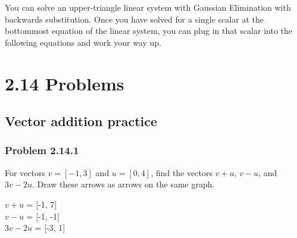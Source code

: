 \documentclass[
  letterpaper,
  DIV=11,
  numbers=noendperiod]{scrartcl}
\begin{document}
You can solve an upper-triangle linear system with Gaussian Elimination
with backwards substitution. Once you have solved for a single scalar at
the bottommost equation of the linear system, you can plug in that
scalar into the following equations and work your way up.

\hypertarget{problems}{%
\section{\texorpdfstring{\textbf{2.14
Problems}}{2.14 Problems}}\label{problems}}

\hypertarget{vector-addition-practice}{%
\subsection{Vector addition practice}\label{vector-addition-practice}}

\hypertarget{problem-2.14.1}{%
\subsubsection{Problem 2.14.1}\label{problem-2.14.1}}

For vectors \(v = [-1, 3]\) and \(u = [0, 4]\), find the vectors
\(v+u\), \(v-u\), and \(3v-2u\). Draw these arrows as arrows on the same
graph.

\(v+u\) = {[}-1, 7{]}\\
\(v-u\) = {[}-1, -1{]}\\
\(3v-2u\) = {[}-3, 1{]}
\end{document}
